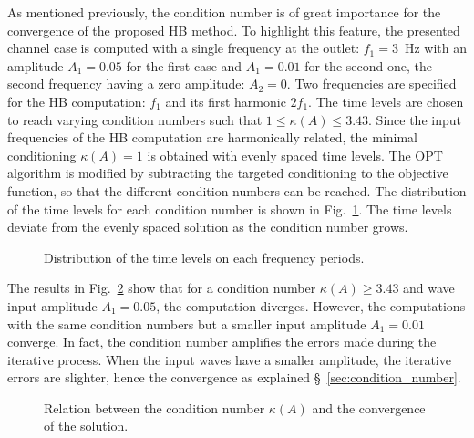 As mentioned previously, the condition number is of great importance
for the convergence of the proposed HB method. To highlight this
feature, the presented channel case is computed with a single
frequency at the outlet: $f_1 = 3$~Hz with an amplitude $A_1 = 0.05$
for the first case and $A_1=0.01$ for the second one, the second
frequency having a zero amplitude: $A_2= 0$.  Two frequencies are
specified for the HB computation: $f_1$ and its first harmonic
$2f_1$. The time levels are chosen to reach varying condition numbers
such that $1 \leq \kappa (A) \leq 3.43$.  Since the input frequencies of the HB
computation are harmonically related, the minimal conditioning
$\kappa(A) = 1$ is obtained with evenly spaced time levels.  The OPT
algorithm is modified by subtracting the targeted conditioning to the
objective function, so that the different condition numbers can be
reached.  The distribution of the time levels for each condition
number is shown in Fig.~\ref{fig:canal2_distribution_tlv}.  The time
levels deviate from the evenly spaced solution as the condition number
grows.
\begin{figure}[htb]
  \centering {}
  \quad {}
  \caption{Distribution of the time levels on each frequency periods.}
  \label{fig:canal2_distribution_tlv}
\end{figure}
The results in Fig.~\ref{fig:canal_residual_vs_conditionning} show that
for a condition number $\kappa (A) \geq 3.43$ and wave input amplitude
$A_1 = 0.05$, the computation diverges. However, the computations with
the same condition numbers but a smaller input amplitude $A_1 = 0.01$
converge. In fact, the condition number amplifies the errors made
during the iterative process. When the input waves have a smaller
amplitude, the iterative errors are slighter, hence the convergence as
explained \S~\ref{sec:condition_number}.
\begin{figure}[htb]
  \centering {}
  \quad
  \caption{Relation between the condition number $\kappa (A)$ and the
    convergence of the solution.}
  \label{fig:canal_residual_vs_conditionning}
\end{figure}


